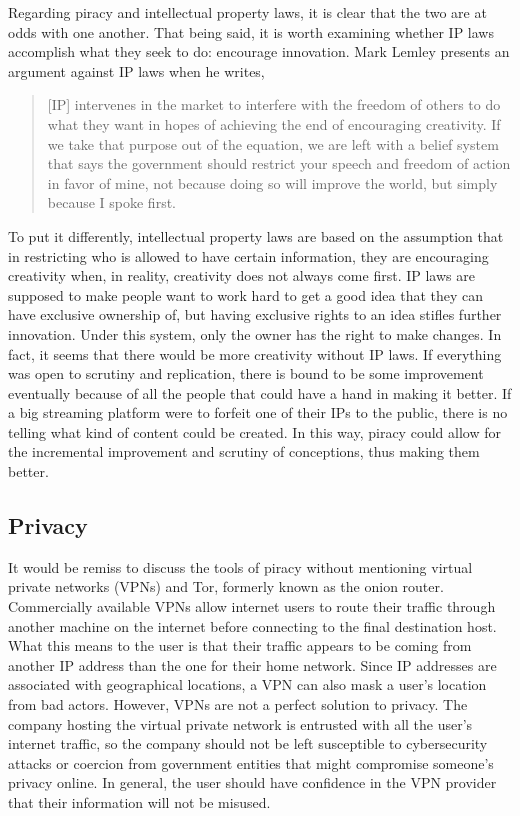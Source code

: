 \documentclass[onecolumn, 12pt]{article}
\begin{document}
Regarding piracy and intellectual property laws, it is clear that the two are at odds with
one another. That being said, it is worth examining whether IP laws accomplish what they
seek to do: encourage innovation. Mark Lemley presents an argument against IP laws when he
writes, \blockcquote[1339]{lemley:faith-based}{[IP] intervenes in the market to interfere
with the freedom of others to do what they want in hopes of achieving the end of
encouraging creativity. If we take that purpose out of the equation, we are left with a
belief system that says the government should restrict your speech and freedom of action
in favor of mine, not because doing so will improve the world, but simply because I spoke
first.} 
To put it differently, intellectual property laws are based on the assumption that in
restricting who is allowed to have certain information, they are encouraging creativity
when, in reality, creativity does not always come first. IP laws are supposed to make
people want to work hard to get a good idea that they can have exclusive ownership of, but
having exclusive rights to an idea stifles further innovation. Under this system, only the
owner has the right to make changes. In fact, it seems that there would be more creativity
without IP laws. If everything was open to scrutiny and replication, there is bound to be
some improvement eventually because of all the people that could have a hand in making it
better. If a big streaming platform were to forfeit one of their IPs to the public, there
is no telling what kind of content could be created. In this way, piracy could allow for
the incremental improvement and scrutiny of conceptions, thus making them better.

\subsection{Privacy}
It would be remiss to discuss the tools of piracy without mentioning virtual private
networks (VPNs) and Tor, formerly known as the onion router. Commercially available VPNs
allow internet users to route their traffic through another machine on the internet before
connecting to the final destination host. What this means to the user is that their
traffic appears to be coming from another IP address than the one for their home network.
Since IP addresses are associated with geographical locations, a VPN can also mask a
user's location from bad actors. However, VPNs are not a perfect solution to privacy. The
company hosting the virtual private network is entrusted with all the user's internet
traffic, so the company should not be left susceptible to cybersecurity attacks or
coercion from government entities that might compromise someone's privacy online. In
general, the user should have confidence in the VPN provider that their information will
not be misused.
\end{document}
